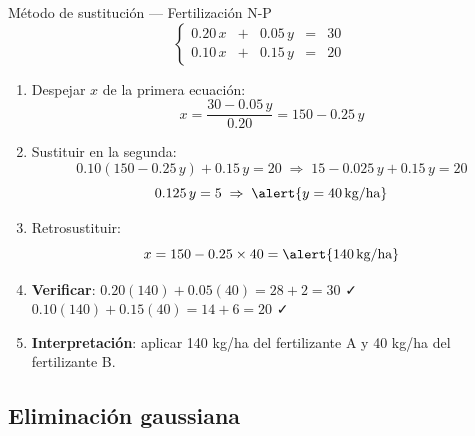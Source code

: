 \documentclass[11pt, aspectratio=169]{beamer}
\newcommand{\unidad}[1]{\,\text{#1}}
\begin{document}
	\begin{frame}{Método de sustitución — Fertilización N-P}
		\[
		\left\{
		\begin{array}{rcrcr}
			0.20\,x & + & 0.05\,y & = & 30 \\[4pt]
			0.10\,x & + & 0.15\,y & = & 20
		\end{array}
		\right.
		\]
		
		\begin{enumerate}
			\item<1-> Despejar $x$ de la primera ecuación:
			\[ x = \frac{30 - 0.05\,y}{0.20} = 150 - 0.25\,y \]
			
			\item<2-> Sustituir en la segunda:
			\[ 0.10(150 - 0.25\,y) + 0.15\,y = 20
			\;\Rightarrow\; 15 - 0.025\,y + 0.15\,y = 20 \]
			\[ 0.125\,y = 5 \;\Rightarrow\; \alert{y = 40 \unidad{kg/ha}} \]
			
			\item<3-> Retrosustituir:
			\[ x = 150 - 0.25 \times 40 = \alert{140 \unidad{kg/ha}} \]
			
			\item<4-> \textbf{Verificar}: $0.20(140) + 0.05(40) = 28 + 2 = 30$ ✓ \quad
			$0.10(140) + 0.15(40) = 14 + 6 = 20$ ✓
			
			\item<5-> \textbf{Interpretación}: aplicar \alert{140 kg/ha} del fertilizante A
			y \alert{40 kg/ha} del fertilizante B.
		\end{enumerate}
	\end{frame}
	
	\subsection{Eliminación gaussiana}
	
\end{document}
